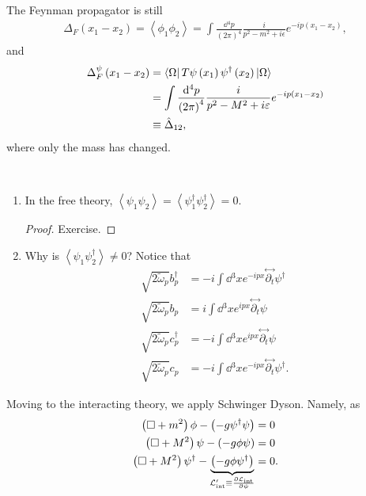 The Feynman propagator is still
\begin{align}
    \Delta_{F} \left( x_1 - x_2 \right) = \left<\phi_1 \phi_2 \right> = \int \frac{\dd{^4p}}{\left( 2\pi\right)^4} \frac{i}{p^2 - m^2 + i \epsilon} e^{-i p \left( x_1 -x_2 \right) }
,\end{align}
and
\begin{align}
    \Delta^{\psi}_F \left( x_1 - x_2 \right) &= \bra{\Omega} T \psi \left( x_1 \right) \psi^{\dag} \left( x_2 \right) \ket{\Omega} \\
    &= \int \frac{\dd{^4p}}{\left( 2\pi\right)^4} \frac{i}{p^2 - M^2 + i \varepsilon} e^{-i p \left( x_1 - x_2 \right) } \\
    &\equiv \hat{\Delta}_{12} 
,\end{align}
where only the mass has changed.

\begin{note}~
    \begin{enumerate}
        \item In the free theory, $\left<\psi_1 \psi_2 \right> = \left<\psi_1^{\dag} \psi_2^{\dag} \right> = 0$.
            \begin{proof}
                Exercise.
            \end{proof}
        \item Why is $\left<\psi_1 \psi_2^{\dag} \right> \neq 0$? Notice that
            \begin{align}
                \sqrt{2 \widetilde{\omega}_p} b^{\dag}_p &= -i \int \dd{^3x} e^{-i p x} \overset{\leftrightarrow}{\partial_t} \psi^{\dag} \\
                \sqrt{2 \widetilde{\omega}_p} b_p &= i \int \dd{^3x} e^{i p x} \overset{\leftrightarrow}{\partial_t} \psi \\
                \sqrt{2 \widetilde{\omega}_p} c_p^{\dag} &= -i \int \dd{^3x} e^{i p x} \overset{\leftrightarrow}{\partial_t} \psi \\
                \sqrt{2 \widetilde{\omega}_p} c_p &= -i \int \dd{^3x} e^{-i p x} \overset{\leftrightarrow}{\partial_t} \psi^{\dag} 
            .\end{align}
    \end{enumerate}
\end{note}

Moving to the interacting theory, we apply Schwinger Dyson. Namely, as
\begin{align}
    \left( \Box + m^2 \right) \phi - \left( -g \psi^{\dag} \psi \right)  &= 0\\
    \left( \Box + M^2 \right) \psi - \left( -g \phi \psi \right)  &= 0\\
    \left( \Box + M^2 \right) \psi^{\dag} - \underbrace{\left( -g \phi \psi^{\dag} \right)}_{\mathcal{L}_\text{int}' \equiv \pdv{\mathcal{L}_\text{int}}{\psi}}  &= 0
.\end{align}

